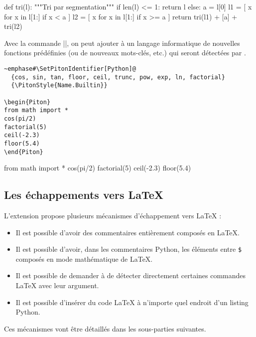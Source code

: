 \documentclass[dvipsnames,svgnames]{article}
\begin{document}
\bigskip

\begingroup


\begin{Piton}
def tri(l):
    """Tri par segmentation"""
    if len(l) <= 1:
        return l
    else:
        a = l[0]
        l1 = [ x for x in l[1:] if x < a  ]
        l2 = [ x for x in l[1:] if x >= a ]
        return tri(l1) + [a] + tri(l2)
\end{Piton}

\endgroup

\bigskip
Avec la commande |\SetPitonIdentifiers|, on peut ajouter à un langage informatique de nouvelles fonctions
prédéfinies (ou de nouveaux mots-clés, etc.) qui seront détectées par .


\begin{Verbatim}
~emphase#\SetPitonIdentifier[Python]@
  {cos, sin, tan, floor, ceil, trunc, pow, exp, ln, factorial}
  {\PitonStyle{Name.Builtin}}

\begin{Piton}
from math import *
cos(pi/2) 
factorial(5)
ceil(-2.3) 
floor(5.4) 
\end{Piton}
\end{Verbatim}

\begingroup

  {}
 
\begin{Piton}
from math import *
cos(pi/2) 
factorial(5)
ceil(-2.3) 
floor(5.4) 
\end{Piton}


\endgroup

\subsection{Les échappements vers LaTeX}


L'extension  propose plusieurs mécanismes d'échappement vers LaTeX :
\begin{itemize}
\item Il est possible d'avoir des commentaires entièrement composés en LaTeX.
\item Il est possible d'avoir, dans les commentaires Python, les éléments entre \texttt{\$} composés en mode
mathématique de LaTeX.
\item Il est possible de demander à  de détecter directement certaines commandes LaTeX avec leur argument.
\item Il est possible d'insérer du code LaTeX à n'importe quel endroit d'un listing Python.
\end{itemize}
Ces mécanismes vont être détaillés dans les sous-parties suivantes.
\end{document}
